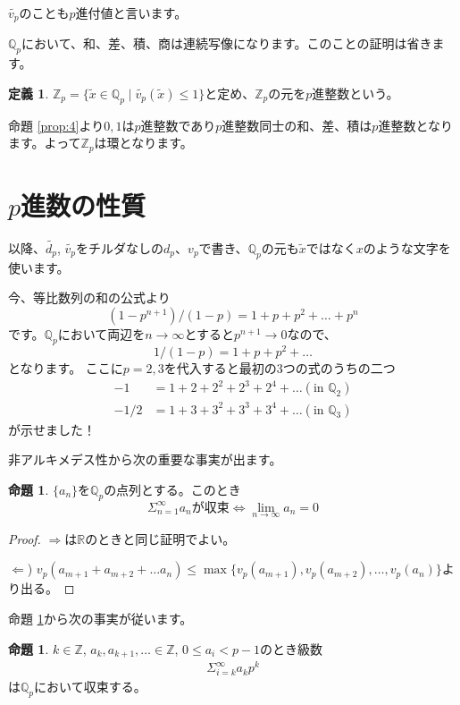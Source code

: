 \documentclass[uplatex]{jsarticle}
\newcommand{\Z}{\mathbb{Z}}
\newcommand{\Q}{\mathbb{Q}}
\newcommand{\R}{\mathbb{R}}
\theoremstyle{definition} %
\newtheorem{defi}[thm]{定義}
\newtheorem{prop}[thm]{命題}
\begin{document}
$\tilde{v_p}$のことも$p$進付値と言います。

$\Q_p$において、和、差、積、商は連続写像になります。このことの証明は省きます。

\begin{oframed}\begin{defi}
$\Z_p = \{\tilde{x} \in \Q_p \mid \tilde{v_p}(\tilde{x}) \le 1 \}$と定め、$\Z_p$の元を$p$進整数という。
\end{defi}\end{oframed}

命題 \ref{prop:4}より$0, 1$は$p$進整数であり$p$進整数同士の和、差、積は$p$進整数となります。よって$\Z_p$は環となります。

\section{$p$進数の性質}

以降、$\tilde{d_p}$, $\tilde{v_p}$をチルダなしの$d_p$、$v_p$で書き、$\Q_p$の元も$\tilde{x}$ではなく$x$のような文字を使います。

今、等比数列の和の公式より
\[(1-p^{n+1}) / (1-p) = 1 + p + p^2 + \dots + p^n\]
です。$\Q_p$において両辺を$n \to \infty$とすると$p^{n+1} \to 0$なので、
\[1 / (1-p) = 1 + p + p^2 + \dots\]
となります。
ここに$p = 2, 3$を代入すると最初の3つの式のうちの二つ
\begin{align*}
-1 &= 1 + 2 + 2^2 + 2^3 + 2^4 + \dots (\text{in } \Q_2) \\
-1/2 &= 1 + 3 + 3^2 + 3^3 + 3^4 + \dots (\text{in } \Q_3)
\end{align*}
が示せました！

非アルキメデス性から次の重要な事実が出ます。

\begin{oframed}\begin{prop}\label{prop:3}
$\{a_n\}$を$\Q_p$の点列とする。このとき
\[\Sigma_{n=1}^\infty a_n が収束 \iff \lim_{n\to\infty} a_n = 0\]
\end{prop}\end{oframed}
\begin{proof}
$\Rightarrow$は$\R$のときと同じ証明でよい。

$\Leftarrow$) $v_p(a_{m+1} + a_{m+2} + \dots a_n) \leq \max\{v_p(a_{m+1}),  v_p(a_{m+2}), \dots, v_p(a_n)\}$より出る。
\end{proof}

命題 \ref{prop:3}から次の事実が従います。

\begin{oframed}\begin{prop}
$k \in \Z$, $a_k, a_{k+1}, \dots \in \Z$, $0 \le a_i < p-1$のとき級数
\begin{align}
\Sigma_{i=k}^\infty a_k p^k \label{eq:1}
\end{align}
は$\Q_p$において収束する。
\end{prop}\end{oframed}
\end{document}
